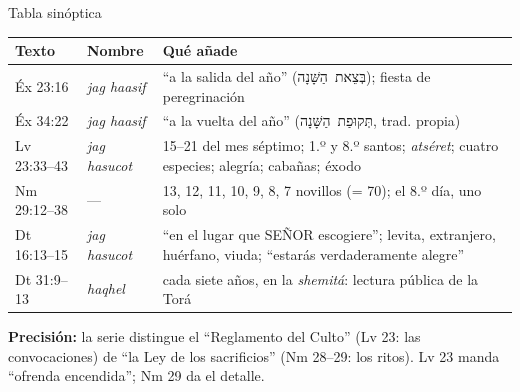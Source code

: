 \documentclass[hyperref={bookmarks=false},aspectratio=169]{beamer}
\newcommand{\heb}[1]{\mbox{\foreignlanguage{hebrew}{#1}}}
\newcommand{\SENOR}{S{\fontsize{0.78em}{1em}\selectfont EÑOR}}
\newcommand{\precision}[1]{{\footnotesize\color{sepia}\textbf{Precisión:} #1}}
\begin{document}
\begin{frame}{Tabla sinóptica}
\scriptsize\renewcommand{\arraystretch}{1.15}
\begin{tabular}{@{}L{1.8cm}L{2.5cm}L{7.6cm}@{}}
\toprule
\textbf{Texto} & \textbf{Nombre} & \textbf{Qué añade} \\ \midrule
Éx 23:16 & \emph{jag haasif} & ``a la salida del año'' (\heb{בְּצֵאת הַשָּׁנָה}); fiesta de peregrinación \\
Éx 34:22 & \emph{jag haasif} & ``a la vuelta del año'' (\heb{תְּקוּפַת הַשָּׁנָה}, trad. propia) \\
Lv 23:33--43 & \emph{jag hasucot} & 15--21 del mes séptimo; 1.º y 8.º santos; \emph{atséret}; cuatro especies; alegría; cabañas; éxodo \\
Nm 29:12--38 & --- & 13, 12, 11, 10, 9, 8, 7 novillos (= 70); el 8.º día, uno solo \\
Dt 16:13--15 & \emph{jag hasucot} & ``en el lugar que \SENOR{} escogiere''; levita, extranjero, huérfano, viuda; ``estarás verdaderamente alegre'' \\
Dt 31:9--13 & \emph{haqhel} & cada siete años, en la \emph{shemitá}: lectura pública de la Torá \\
\bottomrule
\end{tabular}\par\medskip
\precision{la serie distingue el ``Reglamento del Culto'' (Lv 23: las convocaciones) de ``la Ley de los sacrificios'' (Nm 28--29: los ritos). Lv 23 manda ``ofrenda encendida''; Nm 29 da el detalle.}
\end{frame}
\end{document}
